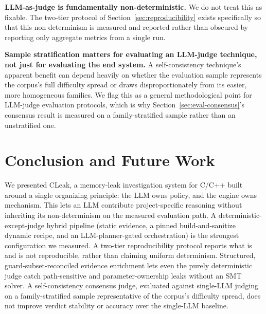 \documentclass[11pt,a4paper]{article}
\begin{document}
\textbf{LLM-as-judge is fundamentally non-deterministic.} We do not treat
this as fixable. The two-tier protocol of Section~\ref{sec:reproducibility}
exists specifically so that this non-determinism is measured and reported
rather than obscured by reporting only aggregate metrics from a single
run.

\textbf{Sample stratification matters for evaluating an LLM-judge
technique, not just for evaluating the end system.} A self-consistency
technique's apparent benefit can depend heavily on whether the evaluation
sample represents the corpus's full difficulty spread or draws
disproportionately from its easier, more homogeneous families. We flag this
as a general methodological point for LLM-judge evaluation protocols, which
is why Section~\ref{sec:eval-consensus}'s consensus result is measured on a
family-stratified sample rather than an unstratified one.

\section{Conclusion and Future Work}

We presented CLeak, a memory-leak investigation system for C/C++ built
around a single organizing principle: the LLM owns policy, and the engine
owns mechanism. This lets an LLM contribute project-specific reasoning
without inheriting its non-determinism on the measured evaluation path. A
deterministic-except-judge hybrid pipeline (static evidence, a pinned
build-and-sanitize dynamic recipe, and an LLM-planner-gated orchestration)
is the strongest configuration we measured. A two-tier reproducibility
protocol reports what is and is not reproducible, rather than claiming
uniform determinism. Structured, guard-subset-reconciled evidence
enrichment lets even the purely deterministic judge catch path-sensitive
and parameter-ownership leaks without an SMT solver. A self-consistency
consensus judge, evaluated against single-LLM judging on a family-stratified
sample representative of the corpus's difficulty spread, does not improve
verdict stability or accuracy over the single-LLM baseline.
\end{document}
